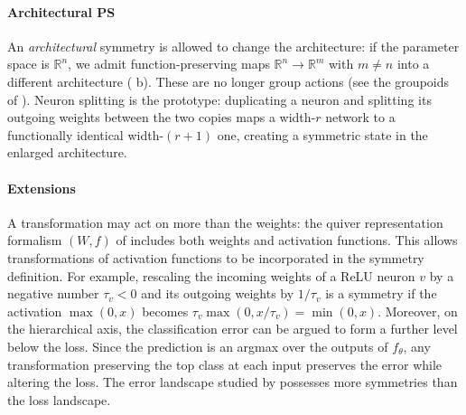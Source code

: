 \documentclass[mathematics,review,submit,moreauthors]{Definitions/mdpi}
\begin{document}
\paragraph{Architectural PS}\label{sec:architectural-sym}
An \emph{architectural} symmetry is allowed to change the architecture: if the parameter space is $\mathbb{R}^n$, we admit function-preserving maps $\mathbb{R}^n\to\mathbb{R}^m$ with $m\neq n$ into a different architecture ( b).
These are no longer group actions (see the groupoids of ).
Neuron splitting is the prototype: duplicating a neuron and splitting its outgoing weights between the two copies maps a width-$r$ network to a functionally identical width-$(r+1)$ one, creating a symmetric state in the enlarged architecture.

\paragraph{Extensions}\label{sec:param-catalog-extension}
A transformation may act on more than the weights: the quiver representation formalism $(W,f)$ of \citet{armenta2021a} includes both weights and activation functions.
This allows transformations of activation functions to be incorporated in the symmetry definition.
For example, rescaling the incoming weights of a ReLU neuron $v$ by a negative number $\tau_v<0$ and its outgoing weights by $1/\tau_v$ is a symmetry if the activation $\max (0, x)$ becomes $\tau_v\max(0, x/\tau_v)=\min(0,x)$.
Moreover, on the hierarchical axis, the classification error can be argued to form a further level below the loss.
Since the prediction is an argmax over the outputs of $f_\theta$, any transformation preserving the top class at each input preserves the error while altering the loss.
The error landscape studied by \citet{pittorino2022jsm} possesses more symmetries than the loss landscape.
\end{document}

